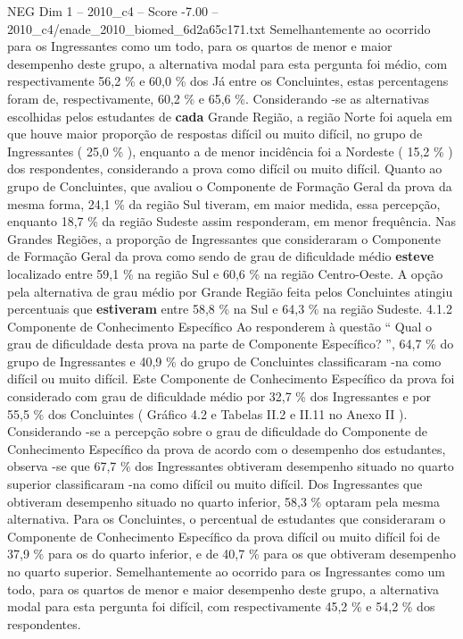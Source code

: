 \begin{textsample}{NEG Dim 1 – 2010\_c4 – Score -7.00 – 2010\_c4/enade\_2010\_biomed\_6d2a65c171.txt}
Semelhantemente ao ocorrido para os Ingressantes como um todo, para os quartos de menor e maior desempenho deste grupo, a alternativa modal para esta pergunta foi médio, com respectivamente 56,2 \% e 60,0 \% dos Já entre os Concluintes, estas percentagens foram de, respectivamente, 60,2 \% e 65,6 \%.
Considerando -se as alternativas escolhidas pelos estudantes de \textbf{cada} Grande Região, a região Norte foi aquela em que houve maior proporção de respostas difícil ou muito difícil, no grupo de Ingressantes ( 25,0 \% ), enquanto a de menor incidência foi a Nordeste ( 15,2 \% ) dos respondentes, considerando a prova como difícil ou muito difícil.
Quanto ao grupo de Concluintes, que avaliou o Componente de Formação Geral da prova da mesma forma, 24,1 \% da região Sul tiveram, em maior medida, essa percepção, enquanto 18,7 \% da região Sudeste assim responderam, em menor frequência.
Nas Grandes Regiões, a proporção de Ingressantes que consideraram o Componente de Formação Geral da prova como sendo de grau de dificuldade médio \textbf{esteve} localizado entre 59,1 \% na região Sul e 60,6 \% na região Centro-Oeste.
A opção pela alternativa de grau médio por Grande Região feita pelos Concluintes atingiu percentuais que \textbf{estiveram} entre 58,8 \% na Sul e 64,3 \% na região Sudeste. 4.1.2 Componente de Conhecimento Específico Ao responderem à questão “ Qual o grau de dificuldade desta prova na parte de Componente Específico? ”, 64,7 \% do grupo de Ingressantes e 40,9 \% do grupo de Concluintes classificaram -na como difícil ou muito difícil.
Este Componente de Conhecimento Específico da prova foi considerado com grau de dificuldade médio por 32,7 \% dos Ingressantes e por 55,5 \% dos Concluintes ( Gráfico 4.2 e Tabelas II.2 e II.11 no Anexo II ).
Considerando -se a percepção sobre o grau de dificuldade do Componente de Conhecimento Específico da prova de acordo com o desempenho dos estudantes, observa -se que 67,7 \% dos Ingressantes obtiveram desempenho situado no quarto superior classificaram -na como difícil ou muito difícil.
Dos Ingressantes que obtiveram desempenho situado no quarto inferior, 58,3 \% optaram pela mesma alternativa.
Para os Concluintes, o percentual de estudantes que consideraram o Componente de Conhecimento Específico da prova difícil ou muito difícil foi de 37,9 \% para os do quarto inferior, e de 40,7 \% para os que obtiveram desempenho no quarto superior.
Semelhantemente ao ocorrido para os Ingressantes como um todo, para os quartos de menor e maior desempenho deste grupo, a alternativa modal para esta pergunta foi difícil, com respectivamente 45,2 \% e 54,2 \% dos respondentes.

\end{textsample}
